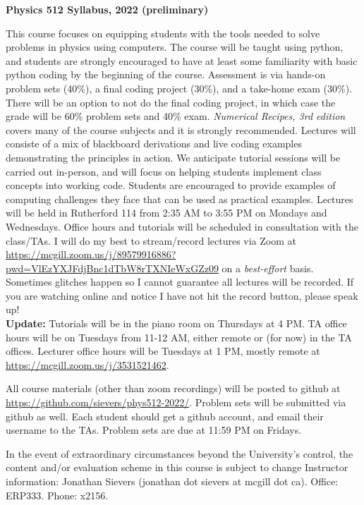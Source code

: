 \documentclass[12]{article}
\begin{document}

\begin{center}{\bf Physics 512 Syllabus, 2022 (preliminary)}
\end{center}
\vskip 0.1in 
This course focuses on equipping students with the tools
needed to solve problems in physics using computers.  The course will
be taught using python, and students are strongly encouraged to have
at least some familiarity with basic python coding by the beginning of
the course.  Assessment is via hands-on problem sets (40\%), a final
coding project (30\%), and a take-home exam (30\%).  There will be an
option to not do the final coding project, in which case the grade
will be 60\% problem sets and 40\% exam.  
{\textit{Numerical Recipes, 3rd edition}} covers many of the course
subjects and it is strongly recommended.  Lectures will consiste of a
mix of blackboard derivations and live coding examples demonstrating
the principles in action.  We anticipate tutorial sessions will be
carried out in-person, and will focus on helping students implement
class concepts into working code.  Students are encouraged to provide
examples of computing challenges they face that can be used as practical examples. 
\vskip 0.1in
\noindent Lectures will be held in Rutherford 114 from 2:35 AM to 3:55
PM on Mondays and Wednesdays. Office hours and tutorials will be
scheduled in consultation with the class/TAs. 
I will do my best to
stream/record lectures via Zoom at
\url{https://mcgill.zoom.us/j/89579916886?pwd=VlEzYXJFdjBnc1dTbW8rTXNIeWxGZz09} on a \textit{best-effort}
basis.  Sometimes glitches happen so I cannot guarantee all lectures
will be recorded.  If you are watching online and notice I have not
hit the record button, please speak up!\\
\textbf{Update:} Tutorials will be in the piano room on Thursdays at 4
PM.  TA office hours will be on Tuesdays from 11-12 AM, either remote
or (for now) in the TA offices.  Lecturer office hours will be
Tuesdays at 1 PM, mostly remote at
\url{https://mcgill.zoom.us/j/3531521462}.  



\noindent All course materials (other than zoom recordings) will be posted to github at
\url{https://github.com/sievers/phys512-2022/}.  Problem sets will be
submitted via github as well.  Each student should get a github account, and
email their username to the TAs.  Problem sets are due at 11:59 PM on Fridays.

\vskip 0.1in
\noindent In the event of extraordinary circumstances beyond the University's
control, the content and/or evaluation scheme in this course is
subject to change
\vskip 0.1in
\noindent
Instructor information:  Jonathan Sievers (jonathan dot sievers at
mcgill dot ca).  Office: ERP333.  Phone: x2156.
\vskip 0.1in
\end{document}
